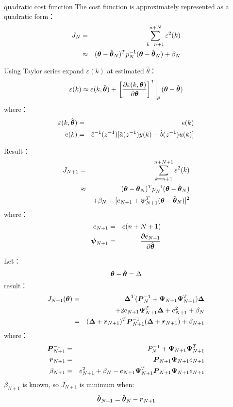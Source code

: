 \begin{frame}{quadratic cost function}
The cost function is approximately represented as a quadratic form：
\begin{eqnarray*}
J_N &=& \sum_{k=n+1}^{n+N}\varepsilon^2(k)\\
&\approx & (\boldsymbol{\theta}-\hat{\boldsymbol{\theta}}_N)^Tp^{-1}_N(\boldsymbol{\theta}-\hat{\boldsymbol{\theta}}_N)+\beta_N\\
\end{eqnarray*}
\end{frame}

\begin{frame}
Using Taylor series expand $\varepsilon(k)$ at estimated $\hat\theta$：
$$
\varepsilon(k)\approx \varepsilon(k,\hat{\boldsymbol{\theta}})+\left.\left[\frac{\partial \varepsilon(k,\boldsymbol{\theta})}{\partial\boldsymbol{\theta}}\right]^T\right|_{\hat\theta}(\boldsymbol{\theta}-\hat{\boldsymbol{\theta}})
$$
where：
\begin{eqnarray*}
\varepsilon(k,\hat{\boldsymbol{\theta}}) &=& e(k) \\
e(k) &=& \hat c^{-1}(z^{-1})[\hat a(z^{-1})y(k)-\hat b(z^{-1})u(k)]
\end{eqnarray*}
\end{frame}

\begin{frame}
Result：
\begin{eqnarray*}
J_{N+1} &=& \sum_{k=n+1}^{n+N+1}\varepsilon^2(k) \\
&\approx & (\boldsymbol{\theta}-\hat{\boldsymbol{\theta}}_N)^Tp^{-1}_N(\boldsymbol{\theta}-\hat{\boldsymbol{\theta}}_N) \\
&&+\beta_N+[e_{N+1}+\boldsymbol{\psi}^T_{N+1}(\boldsymbol{\theta}-\hat{\boldsymbol{\theta}}_N)]^2 
\end{eqnarray*}
where：
\begin{eqnarray*}
e_{N+1} &=& e(n+N+1) \\
\boldsymbol{\psi}_{N+1} &=& \frac{\partial e_{N+1}}{\partial\hat{\boldsymbol{\theta}}}
\end{eqnarray*}
\end{frame}

\begin{frame}
Let：
$$\boldsymbol{\theta}-\hat{\boldsymbol{\theta}}=\Delta$$
result：
\begin{eqnarray*}
J_{N+1}(\boldsymbol{\theta}) &=& \boldsymbol{\Delta}^T(\boldsymbol{P}_N^{-1} +\boldsymbol{\Psi}_{N+1}\boldsymbol{\Psi}_{N+1}^T)\boldsymbol{\Delta} \\
&& +2e_{N+1}\boldsymbol{\Psi}^T_{N+1}\boldsymbol{\Delta}+e^2_{N+1}+\beta_N \\
 &=& (\boldsymbol{\Delta}+\boldsymbol{r}_{N+1})^T\boldsymbol{P}_{N+1}^{-1}(\boldsymbol{\Delta}+\boldsymbol{r}_{N+1})+\beta_{N+1}
\end{eqnarray*}
where：
\begin{eqnarray*}
\boldsymbol{P}_{N+1}^{-1} &=& P_N^{-1}+\boldsymbol{\Psi}_{N+1}\boldsymbol{\Psi}_{N+1}^T  \\
\boldsymbol{r}_{N+1} &=& \boldsymbol{P}_{N+1}\boldsymbol{\Psi}_{N+1}e_{N+1} \\
\beta_{N+1} &=& e_{N+1}^2+\beta_N-e_{N+1}\boldsymbol{\Psi}_{N+1}^T\boldsymbol{P}_{N+1}\boldsymbol{\Psi}_{N+1}e_{N+1}
\end{eqnarray*}
$\beta_{N+1}$ is known, so  $J_{N+1}$ is minimum when:
$$
\hat{\boldsymbol{\theta}}_{N+1}=\hat{\boldsymbol{\theta}}_N-\boldsymbol{r}_{N+1}
$$
\end{frame}

